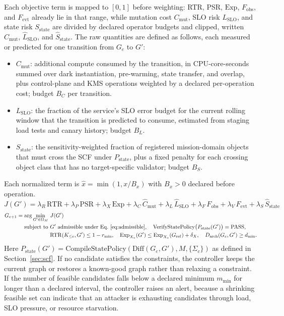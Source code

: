 \documentclass[11pt,letterpaper]{article}
\begin{document}
Each objective term is mapped to $[0,1]$ before weighting: RTR, PSR, $\mathrm{Exp}$, $F_{\mathrm{obs}}$, and $F_{\mathrm{evt}}$ already lie in that range, while mutation cost $C_{\mathrm{mut}}$, SLO risk $L_{\mathrm{SLO}}$, and state risk $S_{\mathrm{state}}$ are divided by declared operator budgets and clipped, written $\hat C_{\mathrm{mut}}$, $\hat L_{\mathrm{SLO}}$, and $\hat S_{\mathrm{state}}$. The raw quantities are defined as follows, each measured or predicted for one transition from $G_e$ to $G'$:
\begin{itemize}[leftmargin=1.5em,itemsep=1pt]
\item $C_{\mathrm{mut}}$: additional compute consumed by the transition, in CPU-core-seconds summed over dark instantiation, pre-warming, state transfer, and overlap, plus control-plane and KMS operations weighted by a declared per-operation cost; budget $B_C$ per transition.
\item $L_{\mathrm{SLO}}$: the fraction of the service's SLO error budget for the current rolling window that the transition is predicted to consume, estimated from staging load tests and canary history; budget $B_L$.
\item $S_{\mathrm{state}}$: the sensitivity-weighted fraction of registered mission-domain objects that must cross the SCF under $P_{\mathrm{state}}$, plus a fixed penalty for each crossing object class that has no target-specific validator; budget $B_S$.
\end{itemize}
Each normalized term is $\hat x=\min(1,x/B_x)$ with $B_x>0$ declared before operation.
\begin{equation}\label{eq:J}
J(G')=\lambda_R\,\mathrm{RTR}+\lambda_P\,\mathrm{PSR}+\lambda_X\,\mathrm{Exp}+\lambda_C\,\hat C_{\mathrm{mut}}+\lambda_L\,\hat L_{\mathrm{SLO}}+\lambda_F\,F_{\mathrm{obs}}+\lambda_V\,F_{\mathrm{evt}}+\lambda_S\,\hat S_{\mathrm{state}}
\end{equation}
\begin{equation}\label{eq:select}
\begin{aligned}
G_{e+1}=\arg\min_{G'\in\Omega_M}\ &J(G')\\
\text{subject to}\ &G'\ \text{admissible under Eq.~\eqref{eq:admissible}},\quad \mathrm{VerifyStatePolicy}\big(P_{\mathrm{state}}(G')\big)=\mathrm{PASS},\\
&\mathrm{RTR}(K_{\le e},G')\le 1-r_{\min},\quad
\mathrm{Exp}_{X_v}(G')\le\mathrm{Exp}_{X_v}(G_{\mathrm{ref}})+\delta_X,\quad
D_{\mathrm{arch}}(G_e,G')\ge d_{\min}.
\end{aligned}
\end{equation}
Here $P_{\mathrm{state}}(G')=\mathrm{CompileStatePolicy}(\mathrm{Diff}(G_e,G'),M,\{\Sigma_c\})$ as defined in Section~\ref{sec:scf}. If no candidate satisfies the constraints, the controller keeps the current graph or restores a known-good graph rather than relaxing a constraint. If the number of feasible candidates falls below a declared minimum $m_{\min}$ for longer than a declared interval, the controller raises an alert, because a shrinking feasible set can indicate that an attacker is exhausting candidates through load, SLO pressure, or resource starvation.
\end{document}
